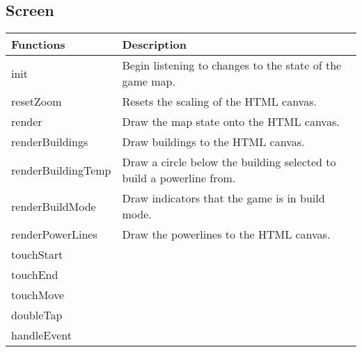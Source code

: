 \subsection*{Screen}

	\begin{table}[H]
	\begin{tabular}{p{4cm} | p{8cm} }
	\hline
	\rowcolor{gray}
	Functions & Description \\ \hline
	init & Begin listening to changes to the state of the game map. \\ \hline
	resetZoom & Resets the scaling of the HTML canvas. \\ \hline
	render & Draw the map state onto the HTML canvas. \\ \hline
	renderBuildings & Draw buildings to the HTML canvas. \\ \hline
	renderBuildingTemp & Draw a circle below the building selected to build a powerline from. \\ \hline
	renderBuildMode & Draw indicators that the game is in build mode. \\ \hline
	renderPowerLines & Draw the powerlines to the HTML canvas. \\ \hline
  	touchStart & \\ \hline

  	touchEnd & \\ \hline

  	touchMove & \\ \hline

  	doubleTap & \\ \hline

  	handleEvent
	\end{tabular}
	\end{table}

